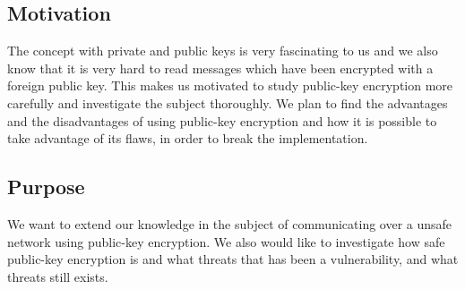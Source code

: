 \documentclass{acm_proc_article-sp}
\begin{document}


\subsection{Motivation}
The concept with private and public keys is very fascinating to us and we also know that it is very hard to read messages which have been encrypted with a foreign public key. This makes us motivated to study public-key encryption more carefully and investigate the subject thoroughly. We plan to find the advantages and the disadvantages of using public-key encryption and how it is possible to take advantage of its flaws, in order to break the implementation. 


\subsection{Purpose}
We want to extend our knowledge in the subject of communicating over a unsafe network using public-key encryption. We also would like to investigate how safe public-key encryption is and what threats that has been a vulnerability, and what threats still exists. 

\end{document}

